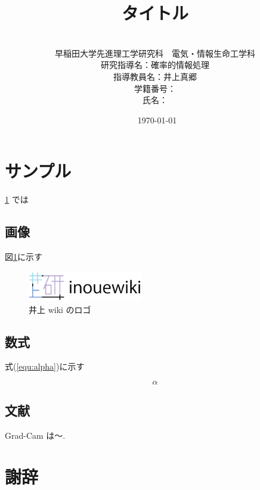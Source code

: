 \documentclass[dvipdfmx,uplatex]{jsarticle}
\def\refeq#1{(\ref{#1})} %
\begin{document}

\pagestyle{empty} %
\title{\vspace{20mm} \huge{タイトル}}
\author{\vspace*{1mm}\ \\早稲田大学先進理工学研究科　電気・情報生命工学科\\研究指導名：確率的情報処理\\指導教員名：井上真郷\\学籍番号：\\氏名：}
\date{\vspace*{1mm}\ \today}
\maketitle %
\clearpage %


\setcounter{page}{1} %
\pagestyle{plain} %
\setcounter{tocdepth}{3}
\tableofcontents %
\clearpage %

\section{サンプル}\label{sec:sample}

\ref{sec:sample} では

\subsection{画像}

図\ref{fig:logo}に示す

\begin{figure}[H] %
  \begin{center}
    \includegraphics[width=50mm]{fig/logo.png}
    \caption{井上 wiki のロゴ}
    \label{fig:logo}
  \end{center}
\end{figure}

\subsection{数式}

式\refeq{equ:alpha}に示す

\begin{equation} %
  \alpha
  \label{equ:alpha}
\end{equation}

\subsection{文献}

Grad-Cam \cite{Selvaraju_2019} は〜.

\section*{謝辞} %

\clearpage

\printbibliography[title=参考文献] %

\end{document}
